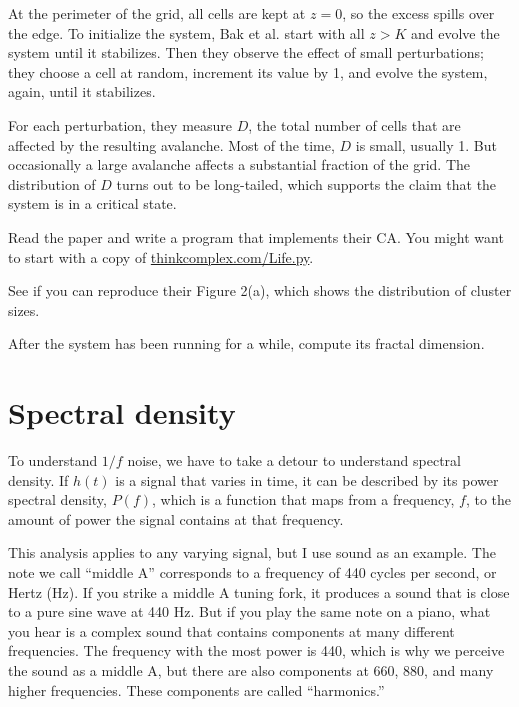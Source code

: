 \documentclass[10pt]{book}
\begin{document}
At the perimeter of the grid, all cells are kept at $z=0$, so
the excess spills over the edge.  To initialize the system,
Bak et al. start with all $z > K$ and evolve the system until
it stabilizes.  Then they observe the effect of small perturbations;
they choose a cell at random, increment its value
by 1, and evolve the system, again, until it stabilizes.

For each perturbation, they measure $D$, the total number
of cells that are affected by the resulting avalanche.  Most of
the time, $D$ is small, usually 1.  But occasionally
a large avalanche affects a substantial fraction
of the grid.  The distribution of $D$ turns out to be long-tailed,
which supports the claim that the system is in a critical state.

\begin{ex}

Read the paper and write a program that implements their CA.
You might want to start with a copy of
\url{thinkcomplex.com/Life.py}.

See if you can reproduce their Figure 2(a), which shows the
distribution of cluster sizes.

After the system has been running for a while, compute its
fractal dimension.

\end{ex}


\section{Spectral density}

To understand $1/f$ noise, we have to take a detour to understand
spectral density.  If $h(t)$ is a signal that varies in time, it can
be described by its power spectral density, $P(f)$, which is a
function that maps from a frequency, $f$, to the amount of power the
signal contains at that frequency.

This analysis applies to any varying signal, but I use sound as
an example.  The note we call ``middle A'' corresponds to a frequency
of 440 cycles per second, or Hertz (Hz).  If you strike a middle A
tuning fork, it produces a sound that is close to a pure sine wave at
440 Hz.  But if you play the same note on a piano, what you hear is
a complex sound that contains components at many different
frequencies.  The frequency with the most power is 440, which is why
we perceive the sound as a middle A, but there are also components at
660, 880, and many higher frequencies.  These components are called
``harmonics.''
\end{document}
